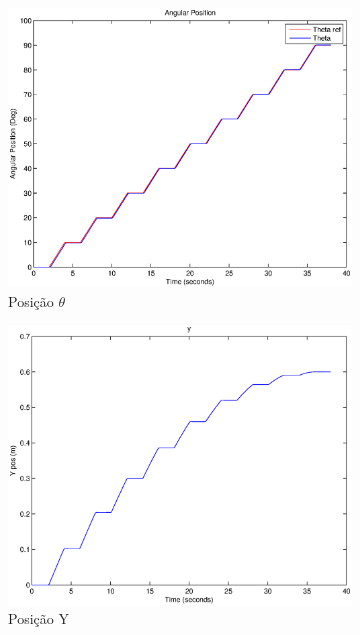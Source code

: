 \documentclass{article}
\begin{document}
\begin{figure}[H]
	\centering
	\begin{subfigure}{0.3\textwidth}
		\includegraphics[width=\linewidth]{matlab/theta6}
		\caption{Posição $\theta$}
	\end{subfigure}
	\begin{subfigure}{0.3\textwidth}
		\includegraphics[width=\linewidth]{matlab/y6}
		\caption{Posição Y}
	\end{subfigure}
	\begin{subfigure}{0.3\textwidth}

\end{subfigure}
\end{figure}
\end{document}

